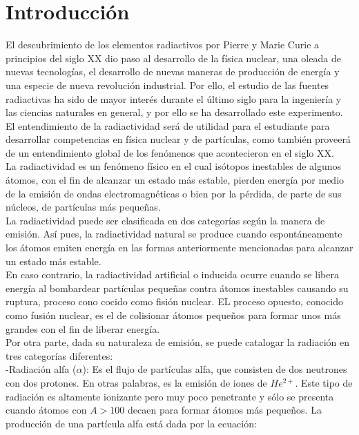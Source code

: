 \documentclass[%
 reprint,
 amsmath,amssymb,
 aps,
]{revtex4-1}
\begin{document}
\section{\label{sec:level1}Introducci\'on}

El descubrimiento de los elementos radiactivos por Pierre y Marie Curie a principios del siglo XX dio paso al desarrollo de la física nuclear, una oleada de nuevas tecnologías, el desarrollo de nuevas maneras de producción de energía y una especie de nueva revolución industrial. Por ello, el estudio de las fuentes radiactivas ha sido de mayor interés durante el último siglo para la ingeniería y las ciencias naturales en general, y por ello se ha desarrollado este experimento. El entendimiento de la radiactividad será de utilidad para el estudiante para desarrollar competencias en física nuclear y de partículas, como también proveerá de un entendimiento global de los fenómenos que acontecieron en el siglo XX.\\

La radiactividad es un fenómeno físico en el cual isótopos inestables de algunos átomos,  con el fin de alcanzar un estado más estable, pierden energía por medio de la emisión de ondas electromagnéticas o bien por la pérdida, de parte de sus núcleos, de partículas más pequeñas.\\

La radiactividad puede ser clasificada en dos categorías según la manera de emisión. Así pues, la radiactividad natural se produce cuando espontáneamente los átomos emiten energía en las formas anteriormente mencionadas para alcanzar un estado más estable.\\

En caso contrario, la radiactividad artificial o inducida ocurre cuando se libera energía al bombardear partículas pequeñas contra átomos inestables causando su ruptura, proceso cono cocido como fisión nuclear. EL proceso opuesto, conocido como fusión nuclear, es el de colisionar átomos pequeños para formar unos más grandes con el fin de liberar energía.\\

Por otra parte, dada su naturaleza de emisión, se puede catalogar la radiación en tres categorías diferentes:\\


-Radiación alfa ($ \alpha $): Es el flujo de partículas alfa, que consisten de dos neutrones con dos protones. En otras palabras, es la emisión de iones de $He^{2+}$. Este tipo de radiación es altamente ionizante pero muy poco penetrante y sólo se presenta cuando átomos con $A>100$ decaen para formar átomos más pequeños. La producción de una partícula alfa está dada por la ecuación:\\
\end{document}
